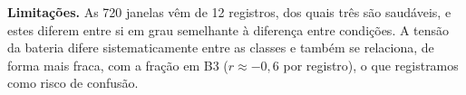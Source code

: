 \textbf{Limitações.} As 720 janelas vêm de 12 registros, dos quais três são saudáveis, e estes diferem entre si em grau semelhante à diferença entre condições. A tensão da bateria difere sistematicamente entre as classes e também se relaciona, de forma mais fraca, com a fração em B3 ($r\approx-0{,}6$ por registro), o que registramos como risco de confusão.
